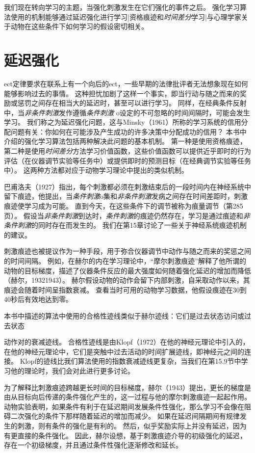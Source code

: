 {我们现在转向学习的主题，当强化刺激发生在它们强化的事件之后。
强化学习算法使用的机制能够通过延迟强化进行学习|资格痕迹和\textit{时间差分}学习|与心理学家关于动物在这些条件下如何学习的假设密切相关。


\section{延迟强化}


ect定律要求在联系上有一个向后的ect，一些早期的法律批评者无法想象现在如何能够影响过去的事情。
这种担忧加剧了这样一个事实，即当行动与随之而来的奖励或惩罚之间存在相当大的延迟时，甚至可以进行学习。
同样，在经典条件反射中，当\textit{非条件刺激}发作遵循\textit{条件刺激} o设定的不可忽略的时间间隔时，可能会发生学习。
我们称之为延迟强化问题，这与Minsky（1961）所称的学习系统的信用分配问题有关：你如何在可能涉及产生成功的许多决策中分配成功的信用？
本书中介绍的强化学习算法包括两种解决此问题的基本机制。
第一种是使用资格痕迹，第二种是使用\textit{时间差分}方法学习价值函数，这些价值函数可以提供近乎即时的行为评估（在仪器调节实验等任务中）或提供即时的预测目标（在经典调节实验等任务中）。
这两种方法都对应于动物学习理论中提出的类似机制。


巴甫洛夫（1927）指出，每个刺激都必须在刺激结束后的一段时间内在神经系统中留下痕迹，他提出，当\textit{条件刺激}o集和\textit{非条件刺激}发病之间存在时间差距时，刺激痕迹使学习成为可能。
直到今天，在这些条件下的调节被称为痕量调节（第285页）。
假设当\textit{非条件刺激}到达时，\textit{条件刺激}的痕迹仍然存在，学习是通过痕迹和\textit{非条件刺激}的同时存在而发生的。
我们在第15章讨论了一些关于神经系统痕迹机制的建议。


刺激痕迹也被提议作为一种手段，用于弥合仪器调节中动作与随之而来的奖惩之间的时间间隔。
例如，在赫尔的内在学习理论中，“摩尔刺激痕迹”解释了他所谓的动物的目标梯度，描述了仪器条件反应的最大强度如何随着强化延迟的增加而降低（赫尔，19321943）。
赫尔假设动物的动作会留下内部刺激，自采取动作以来，其痕迹会随着时间呈指数衰减。
查看当时可用的动物学习数据，他假设痕迹在30到40秒后有效地达到零。




本书中描述的算法中使用的合格性迹线类似于赫尔迹线：它们是过去状态访问或过去状态{动作对的衰减迹线。
合格性迹线是由Klopf（1972）在他的神经元理论中引入的，在他的神经元理论中，它们是突触中过去活动的时间扩展迹线，即神经元之间的连接。
Klopf的迹线比我们算法使用的指数衰减迹线更复杂，当我们在第15.9节中学习他的理论时，我们会对此进行更多讨论。


为了解释比刺激痕迹跨越更长时间的目标梯度，赫尔（1943）提出，更长的梯度是由从目标向后传递的条件强化产生的，这一过程与他的摩尔刺激痕迹一起起作用。
动物实验表明，如果条件有利于在延迟期间发展条件性强化，那么学习不会像在阻碍二次强化的条件下那样随着延迟的增加而减少。
如果在延迟间隔期间有规律发生的刺激，则有条件的强化是有利的。
然后，似乎奖励实际上并没有延迟，因为有更直接的条件强化。
因此，赫尔设想，基于刺激痕迹介导的初级强化的延迟，存在一个初级梯度，并且通过条件性强化逐渐修改和延长。


}}
